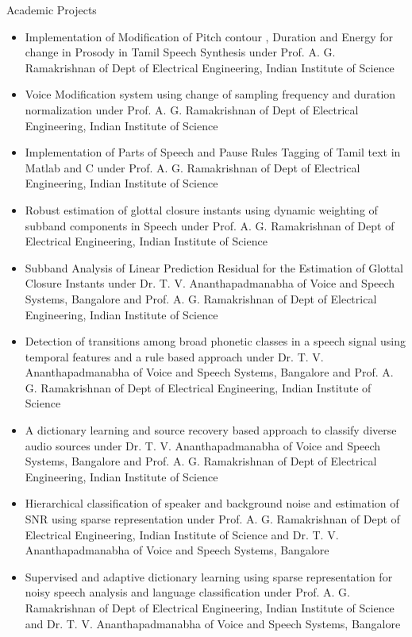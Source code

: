 \documentclass[10pt]{article}
\begin{document}
\begin{cv}
\begin{cvlist}{Academic Projects}
\begin{itemize}
\item
Implementation of Modification of Pitch contour , Duration and Energy   for change in Prosody in Tamil Speech Synthesis under Prof. A. G. Ramakrishnan of Dept of Electrical
Engineering, Indian Institute of Science
\item
Voice Modification system using change of sampling frequency and duration normalization under Prof. A. G. Ramakrishnan of Dept of Electrical
Engineering, Indian Institute of Science
\item
Implementation of Parts of Speech and Pause Rules Tagging of Tamil text in Matlab and C under Prof. A. G. Ramakrishnan of Dept of Electrical
Engineering, Indian Institute of Science
\item
Robust estimation of glottal closure instants using dynamic weighting of subband components in Speech under Prof. A. G. Ramakrishnan of Dept of Electrical
Engineering, Indian Institute of Science

\item Subband Analysis of Linear Prediction Residual for the Estimation of Glottal Closure Instants under Dr. T. V. Ananthapadmanabha of Voice and Speech Systems, Bangalore and Prof. A. G. Ramakrishnan of Dept of Electrical Engineering, Indian Institute of Science

\item Detection of transitions among broad phonetic classes in a speech signal
          using temporal features and a rule based approach under Dr. T. V. Ananthapadmanabha of Voice and Speech Systems, Bangalore and Prof. A. G. Ramakrishnan of Dept of Electrical Engineering, Indian Institute of Science

\item A dictionary learning and source recovery based approach to classify diverse
                               audio sources under Dr. T. V. Ananthapadmanabha of Voice and Speech Systems, Bangalore and Prof. A. G. Ramakrishnan of Dept of Electrical Engineering, Indian Institute of Science
                               
\item Hierarchical classification of speaker and background noise and estimation of SNR using sparse representation under Prof. A. G. Ramakrishnan of Dept of Electrical Engineering, Indian Institute of Science and  Dr. T. V. Ananthapadmanabha of Voice and Speech Systems, Bangalore  

\item Supervised  and adaptive dictionary learning using  sparse representation for noisy speech analysis and language classification under Prof. A. G. Ramakrishnan of Dept of Electrical Engineering, Indian Institute of Science and  Dr. T. V. Ananthapadmanabha of Voice and Speech Systems, Bangalore  
	\end{itemize}


\end{cvlist}
\end{cv}
\end{document}
